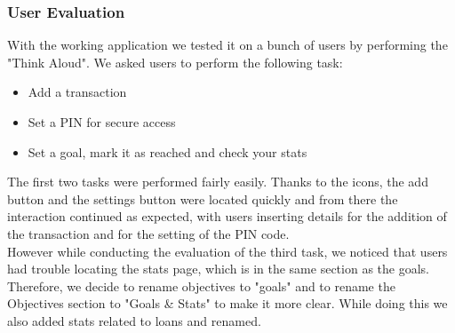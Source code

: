 \documentclass[a4paper,12pt]{article}
\begin{document}
\subsubsection{User Evaluation}
With the working application we tested it on a bunch of users by performing the "Think Aloud". We asked users to perform the following task:
\begin{itemize}
    \item Add a transaction
    \item Set a PIN for secure access
    \item Set a goal, mark it as reached and check your stats
\end{itemize}
The first two tasks were performed fairly easily. Thanks to the icons, the add button and the settings button were located quickly and from there the interaction continued as expected, with users inserting details for the addition of the transaction and for the setting of the PIN code.
\vspace{0.5cm}\\
However while conducting the evaluation of the third task, we noticed that users had trouble locating the stats page, which is in the same section as the goals.
Therefore, we decide to rename objectives to "goals" and to rename the Objectives section to "Goals \& Stats" to make it more clear.
While doing this we also added stats related to loans and renamed.
\end{document}
